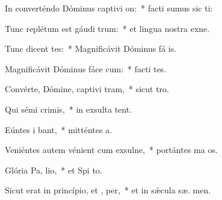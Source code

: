 \item In converténdo Dóminus captivi on:~* facti sumus sic ti:
\item Tunc replétum est gáudi  trum:~* et lingua nostra exne.
\item Tunc dicent  tes:~* Magnificávit Dóminus fá  is.
\item Magnificávit Dóminus fáce cum:~* facti  tes.
\item Convérte, Dómine, captivi tram,~* sicut   tro.
\item Qui sémi  crimis,~* in exsulta tent.
\item Eúntes i  bant,~* mitténtes  a.
\item Veniéntes autem vénient cum exsulne,~* portántes ma os.
\item Glória Pa,  lio,~* et Spi to.
\item Sicut erat in princípio, et ,  per,~* et in sǽcula sæ. men.

